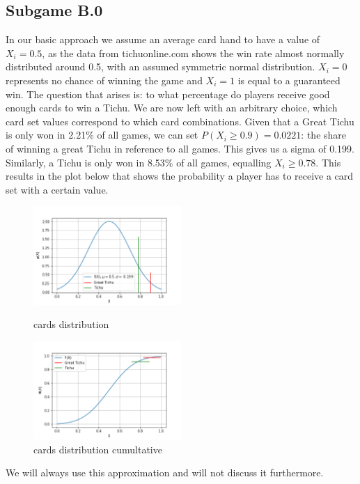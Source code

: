\subsection{Subgame B.0}
In our basic approach we assume an average card hand to have a value of $X_i = 0.5$, as the data from tichuonline.com shows the win rate almost normally distributed around 0.5, with an assumed symmetric normal distribution. $X_i = 0$ represents no chance of winning the game and $X_i = 1$ is equal to a guaranteed win. The question that arises is: to what percentage do players receive good enough cards to win a Tichu. We are now left with an arbitrary choice, which card set values correspond to which card combinations. Given that a Great Tichu is only won in 2.21$\%$ of all games, we can set $P(X_i \geq 0.9) = 0.0221$: the share of winning a great Tichu in reference to all games. This gives us a sigma of 0.199. Similarly, a Tichu is only won in 8.53$\%$ of all games, equalling $X_i\geq 0.78$. This results in the plot below that shows the probability a player has to receive a card set with a certain value.

\begin{figure}[h]
    \centering
    \includegraphics[width=0.5\textwidth]{Bilder/cards_distribution}
    \caption{cards distribution}
    \label{fig:meine-grafik}
    \centering
    \includegraphics[width=0.5\textwidth]{Bilder/cards_distribution_cumultative}
    \caption{cards distribution cumultative}
    \label{fig:meine-grafik}
\end{figure}
We will always use this approximation and will not discuss it furthermore.

